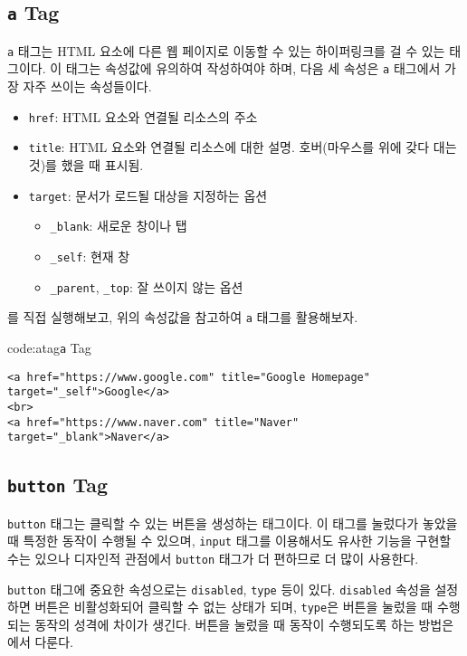 \subsection*{\texttt{a} Tag}
\texttt{a} 태그는 HTML 요소에 다른 웹 페이지로 이동할 수 있는 하이퍼링크를 걸 수 있는 태그이다. 이 태그는 속성값에 유의하여 작성하여야 하며, 다음 세 속성은 \texttt{a} 태그에서 가장 자주 쓰이는 속성들이다. 
\newpage

\begin{itemize}
    \item \texttt{href}: HTML 요소와 연결될 리소스의 주소
    \item \texttt{title}: HTML 요소와 연결될 리소스에 대한 설명. 호버(마우스를 위에 갖다 대는 것)를 했을 때 표시됨.
    \item \texttt{target}: 문서가 로드될 대상을 지정하는 옵션
        \begin{itemize}
            \item \texttt{\_blank}: 새로운 창이나 탭
            \item \texttt{\_self}: 현재 창
            \item \texttt{\_parent}, \texttt{\_top}: 잘 쓰이지 않는 옵션
        \end{itemize}
\end{itemize}

를 직접 실행해보고, 위의 속성값을 참고하여 \texttt{a} 태그를 활용해보자.

\begin{codeenv}{code:atag}{\texttt{a} Tag}\begin{verbatim}
<a href="https://www.google.com" title="Google Homepage" target="_self">Google</a>
<br>
<a href="https://www.naver.com" title="Naver" target="_blank">Naver</a>
\end{verbatim}
\end{codeenv}

\subsection*{\texttt{button} Tag}
\texttt{button} 태그는 클릭할 수 있는 버튼을 생성하는 태그이다. 이 태그를 눌렀다가 놓았을 때 특정한 동작이 수행될 수 있으며, \texttt{input} 태그를 이용해서도 유사한 기능을 구현할 수는 있으나 디자인적 관점에서 \texttt{button} 태그가 더 편하므로 더 많이 사용한다. 

\texttt{button} 태그에 중요한 속성으로는 \texttt{disabled}, \texttt{type} 등이 있다. \texttt{disabled} 속성을 설정하면 버튼은 비활성화되어 클릭할 수 없는 상태가 되며, \texttt{type}은 버튼을 눌렀을 때 수행되는 동작의 성격에 차이가 생긴다. 버튼을 눌렀을 때 동작이 수행되도록 하는 방법은 에서 다룬다.


